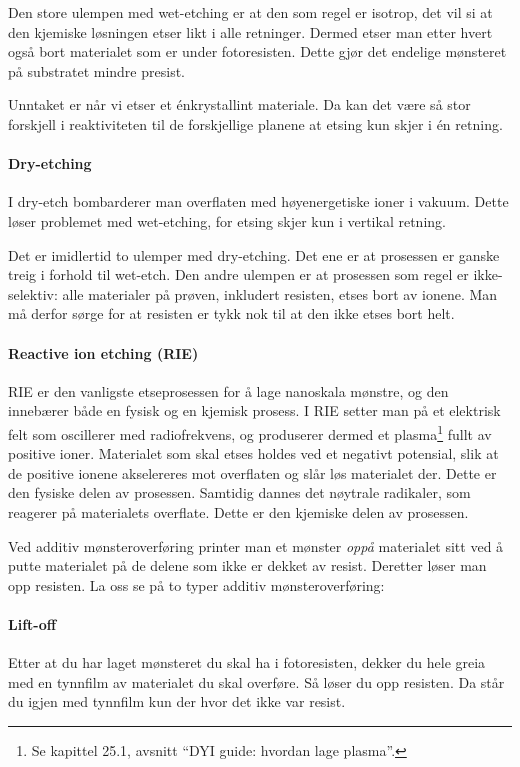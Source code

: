 Den store ulempen med wet-etching er at den som regel er isotrop, det vil si at den kjemiske løsningen etser likt i alle retninger. Dermed etser man etter hvert også bort materialet som er under fotoresisten. Dette gjør det endelige mønsteret på substratet mindre presist. 

Unntaket er når vi etser et énkrystallint materiale. Da kan det være så stor forskjell i reaktiviteten til de forskjellige planene at etsing kun skjer i én retning.

\paragraph{Dry-etching} I dry-etch bombarderer man overflaten med høyenergetiske ioner i vakuum. Dette løser problemet med wet-etching, for etsing skjer kun i vertikal retning.

Det er imidlertid to ulemper med dry-etching. Det ene er at prosessen er ganske treig i forhold til wet-etch. Den andre ulempen er at prosessen som regel er ikke-selektiv: alle materialer på prøven, inkludert resisten, etses bort av ionene. Man må derfor sørge for at resisten er tykk nok til at den ikke etses bort helt.

\paragraph{Reactive ion etching (RIE)} RIE er den vanligste etseprosessen for å lage nanoskala mønstre, og den innebærer både en fysisk og en kjemisk prosess. I RIE setter man på et elektrisk felt som oscillerer med radiofrekvens, og produserer dermed et plasma\footnote{Se kapittel 25.1, avsnitt ``DYI guide: hvordan lage plasma''.} fullt av positive ioner. Materialet som skal etses holdes ved et negativt potensial, slik at de positive ionene akselereres mot overflaten og slår løs materialet der. Dette er den fysiske delen av prosessen. Samtidig dannes det nøytrale radikaler, som reagerer på materialets overflate. Dette er den kjemiske delen av prosessen. 

 Ved additiv mønsteroverføring printer man et mønster \emph{oppå} materialet sitt ved å putte materialet på de delene som ikke er dekket av resist. Deretter løser man opp resisten. La oss se på to typer additiv mønsteroverføring:

\paragraph{Lift-off} Etter at du har laget mønsteret du skal ha i fotoresisten, dekker du hele greia med en tynnfilm av materialet du skal overføre. Så løser du opp resisten. Da står du igjen med tynnfilm kun der hvor det ikke var resist.

